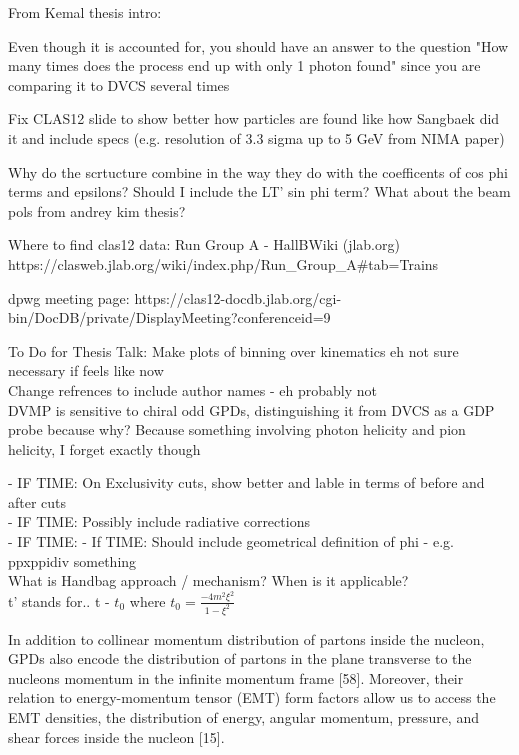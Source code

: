 From Kemal thesis intro:

Even though it is accounted for, you should have an answer to the question "How many times does the process end up with only 1 photon found" since you are comparing it to DVCS several times

Fix CLAS12 slide to show better how particles are found like how Sangbaek did it and include specs (e.g. resolution of 3.3 sigma up to 5 GeV from NIMA paper)

Why do the scrtucture combine in the way they do with the coefficents of cos phi terms and epsilons? Should I include the LT' sin phi term? What about the beam pols from andrey kim thesis?

Where to find clas12 data:
Run Group A - HallBWiki (jlab.org)
https://clasweb.jlab.org/wiki/index.php/Run_Group_A#tab=Trains

dpwg meeting page: https://clas12-docdb.jlab.org/cgi-bin/DocDB/private/DisplayMeeting?conferenceid=9



To Do for Thesis Talk:
Make plots of binning over kinematics eh not sure necessary if feels like now\\
Change refrences to include author names - eh probably not\\

 DVMP is sensitive to chiral odd GPDs, distinguishing it from DVCS as a GDP probe because why? Because something involving photon helicity and pion helicity, I forget exactly though
 
 - IF TIME: On Exclusivity cuts, show better and lable in terms of before and after cuts\\
- IF TIME: Possibly include radiative corrections\\
- IF TIME: 
- If TIME: Should include geometrical definition of phi - e.g. ppxppidiv something\\

What is Handbag approach / mechanism? When is it applicable?\\
t' stands for.. t - $t_0$ where $t_0 = \frac{-4m^2\xi^2}{1-\xi^2}$


In addition to collinear momentum distribution of partons inside the
nucleon, GPDs also encode the distribution of partons in the plane transverse to
the nucleons momentum in the infinite momentum frame [58]. Moreover, their
relation to energy-momentum tensor (EMT) form factors allow us to access the
EMT densities, the distribution of energy, angular momentum, pressure, and shear
forces inside the nucleon [15].

